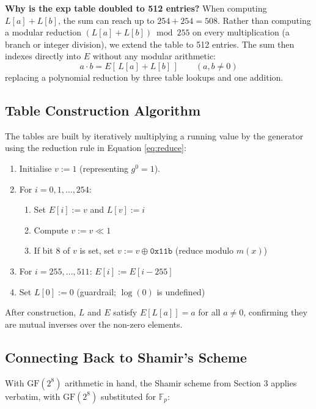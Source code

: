 \documentclass[12pt]{article}
\theoremstyle{definition}
\theoremstyle{plain}
\begin{document}
	\textbf{Why is the exp table doubled to 512 entries?}
	When computing $L[a] + L[b]$, the sum can reach up to $254 + 254 = 508$.
	Rather than computing a modular reduction $(L[a] + L[b]) \bmod 255$ on
	every multiplication (a branch or integer division), we extend the table to 512 entries.
	The sum then indexes directly into $E$ without any modular arithmetic:
	$$ a \cdot b = E[\,L[a] + L[b]\,] \qquad (a, b \ne 0)$$
	replacing a polynomial reduction by three table lookups and one addition.
	
	\subsection{Table Construction Algorithm}
	
	The tables are built by iteratively multiplying a running value by the
	generator using the reduction rule in Equation \eqref{eq:reduce}:
	
	\begin{enumerate}
		\item Initialise $v := 1$ (representing $g^0 = 1$).
		\item For $i = 0, 1, \dots, 254$:
		\begin{enumerate}
			\item Set $E[i] := v$ and $L[v] := i$
			\item Compute $v := v \ll 1$
			\item If bit 8 of $v$ is set, set $v := v \oplus \texttt{0x11b}$
			(reduce modulo $m(x)$)
		\end{enumerate}
		\item For $i = 255, \dots, 511$: $E[i] := E[i-255]$
		\item Set $L[0] := 0$ (guardrail; $\log(0)$ is undefined)
	\end{enumerate}
	
	After construction, $L$ and $E$ satisfy $E[L[a]] = a$ for all $a \ne 0$,
	confirming they are mutual inverses over the non-zero elements.
	
	\subsection{Connecting Back to Shamir's Scheme}
	
	With $\mathrm{GF}(2^8)$ arithmetic in hand, the Shamir scheme from
	Section 3 applies verbatim, with $\mathrm{GF}(2^8)$ substituted for
	$\mathbb{F}_p$:
	
\end{document}

